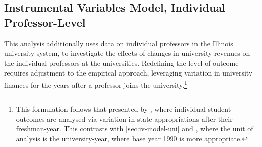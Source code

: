 

\subsection{Instrumental Variables Model, Individual Professor-Level}
\label{sec:iv-model-indiv}

This analysis additionally uses data on individual professors in the Illinois university system, to investigate the effects of changes in university revenues on the individual professors at the universities.
Redefining the level of outcome requires adjustment to the empirical approach, leveraging variation in university finances for the years after a professor joins the university.\footnote{
    This formulation follows that presented by \cite{NBERw27885}, where individual student outcomes are analysed via variation in state appropriations after their freshman-year.
    This contrasts with \autoref{sec:iv-model-uni} and \cite{NBERw23736}, where the unit of analysis is the university-year, where base year 1990 is more appropriate.
}

